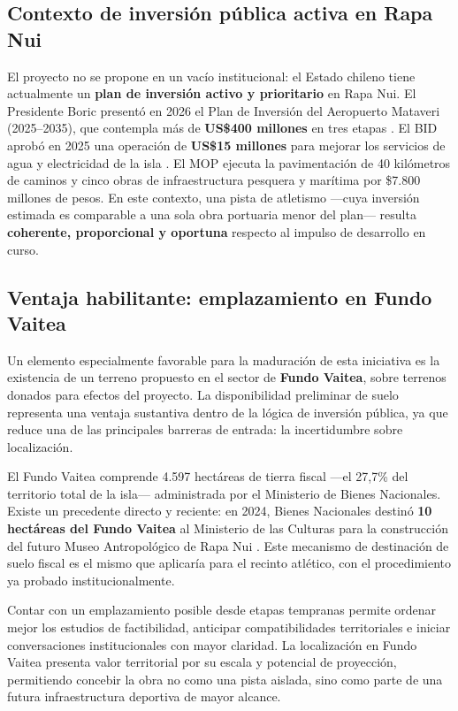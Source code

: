 \documentclass[12pt, a4paper]{article}
\begin{document}
\subsection{Contexto de inversión pública activa en Rapa Nui}

El proyecto no se propone en un vacío institucional: el Estado chileno tiene
actualmente un \textbf{plan de inversión activo y prioritario} en Rapa Nui. El
Presidente Boric presentó en 2026 el Plan de Inversión del Aeropuerto Mataveri
(2025--2035), que contempla más de \textbf{US\$400 millones} en tres etapas
\citep{AeropuertoMataveri2026}. El BID aprobó en 2025 una operación de
\textbf{US\$15 millones} para mejorar los servicios de agua y electricidad de la
isla \citep{BIDAguaRapaNui2025}. El MOP ejecuta la pavimentación de 40 kilómetros
de caminos y cinco obras de infraestructura pesquera y marítima por \$7.800 millones
de pesos. En este contexto, una pista de atletismo ---cuya inversión estimada es
comparable a una sola obra portuaria menor del plan--- resulta \textbf{coherente,
proporcional y oportuna} respecto al impulso de desarrollo en curso.

\subsection{Ventaja habilitante: emplazamiento en Fundo Vaitea}

Un elemento especialmente favorable para la maduración de esta iniciativa es la
existencia de un terreno propuesto en el sector de \textbf{Fundo Vaitea}, sobre
terrenos donados para efectos del proyecto. La disponibilidad preliminar de suelo
representa una ventaja sustantiva dentro de la lógica de inversión pública, ya que
reduce una de las principales barreras de entrada: la incertidumbre sobre
localización.

El Fundo Vaitea comprende 4.597 hectáreas de tierra fiscal ---el 27,7\% del
territorio total de la isla--- administrada por el Ministerio de Bienes Nacionales.
Existe un precedente directo y reciente: en 2024, Bienes Nacionales destinó
\textbf{10 hectáreas del Fundo Vaitea} al Ministerio de las Culturas para la
construcción del futuro Museo Antropológico de Rapa Nui \citep{BienesNacionalesVaitea2024}.
Este mecanismo de destinación de suelo fiscal es el mismo que aplicaría para
el recinto atlético, con el procedimiento ya probado institucionalmente.

Contar con un emplazamiento posible desde etapas tempranas permite ordenar mejor
los estudios de factibilidad, anticipar compatibilidades territoriales e iniciar
conversaciones institucionales con mayor claridad. La localización en Fundo Vaitea
presenta valor territorial por su escala y potencial de proyección, permitiendo
concebir la obra no como una pista aislada, sino como parte de una futura
infra\-estructura deportiva de mayor alcance.
\end{document}
